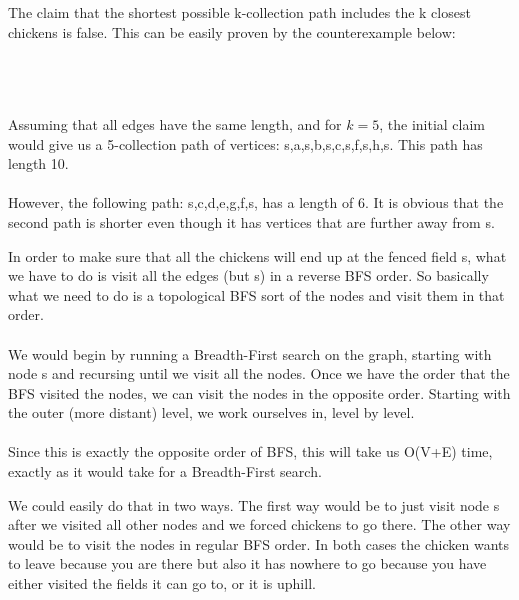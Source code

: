 \documentclass[12pt,twoside]{article}
\begin{document}
\begin{problems}
\begin{problemparts}
\problempart 
The claim that the shortest possible k-collection path includes the k closest chickens is false. This can be easily proven by the counterexample below:
\\\\

\\\\
Assuming that all edges have the same length, and for $k=5$, the initial claim would give us a 5-collection path of vertices: {s,a,s,b,s,c,s,f,s,h,s}. This path has length 10. 
\\\\
However, the following path: {s,c,d,e,g,f,s}, has a length of 6. It is obvious that the second path is shorter even though it has vertices that are further away from s. 

\problempart 

In order to make sure that all the chickens will end up at the fenced field s, what we have to do is visit all the edges (but s) in a reverse BFS order. So basically what we need to do is a topological BFS sort of the nodes and visit them in that order.
\\\\
We would begin by running a Breadth-First search on the graph, starting with node s and recursing until we visit all the nodes. Once we have the order that the BFS visited the nodes, we can visit the nodes in the opposite order. Starting with the outer (more distant) level, we work ourselves in, level by level.
\\\\
Since this is exactly the opposite order of BFS, this will take us O(V+E) time, exactly as it would take for a Breadth-First search.


\problempart 
We could easily do that in two ways. The first way would be to just visit node s after we visited all other nodes and we forced chickens to go there. The other way would be to visit the nodes in regular BFS order. In both cases the chicken wants to leave because you are there but also it has nowhere to go because you have either visited the fields it can go to, or it is uphill.


\end{problemparts}
\end{problems}
\end{document}
